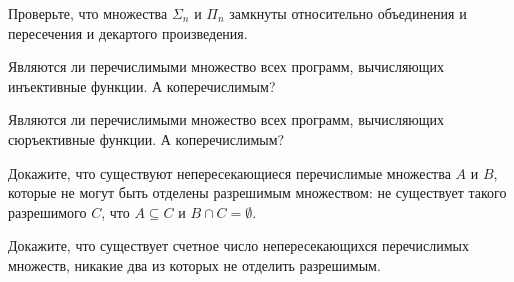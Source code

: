 \begin{task}
    Проверьте, что множества $\Sigma_n$ и $\Pi_n$ замкнуты относительно объединения и пересечения и декартого произведения. 
\end{task}


\begin{task}
	Являются ли перечислимыми множество всех программ, вычисляющих инъективные функции. А коперечислимым?
\end{task}


\begin{task}
    Являются ли перечислимыми множество всех программ, вычисляющих сюръективные функции. А коперечислимым?
\end{task}


\begin{task}
    Докажите, что существуют непересекающиеся перечислимые множества $A$ и $B$, которые не могут быть отделены разрешимым
    множеством: не существует такого разрешимого $C$, что $A \subseteq C$ и $B \cap C = \emptyset$.
\end{task}

\begin{task}
    Докажите, что существует счетное число непересекающихся перечислимых множеств, никакие два из которых не отделить разрешимым.
\end{task}